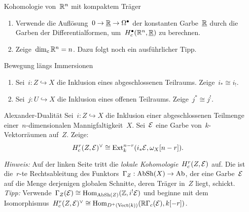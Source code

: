 \documentclass{uebblatt}
\begin{document}
\newpage

\begin{aufgabe}{Kohomologie von~$\mathbb{R}^n$ mit kompaktem Träger}
\begin{enumerate}
\item Verwende die Auflösung~$0 \to \underline{\mathbb{R}} \to \Omega^\bullet$ der konstanten
Garbe~$\underline{\mathbb{R}}$ durch die Garben der Differentialformen,
um~$H_c^\bullet(\mathbb{R}^n,\underline{\mathbb{R}})$ zu berechnen.
\item Zeige~$\dim_c \mathbb{R}^n = n$. {\tiny Dazu folgt noch ein ausführlicher Tipp.}
\end{enumerate}
\end{aufgabe}

\begin{aufgabe}{Bewegung längs Immersionen}
\begin{enumerate}
\item Sei~$i : Z \hookrightarrow X$ die Inklusion eines abgeschlossenen
Teilraums. Zeige~$i_* \cong i_!$.
\item Sei~$j : U \hookrightarrow X$ die Inklusion eines offenen Teilraums.
Zeige~$j^* \cong j^!$.
\end{enumerate}
\end{aufgabe}

\begin{aufgabe}{Alexander-Dualität}
Sei~$i : Z \hookrightarrow X$ die Inklusion einer abgeschlossenen Teilmenge
einer~$n$-dimensionalen Mannigfaltigkeit~$X$. Sei~$\mathcal{E}$ eine Garbe
von~$k$-Vektorräumen auf~$Z$. Zeige: \[ H_c^r(Z,\mathcal{E})^\vee \cong
\mathrm{Ext}_k^{n-r}(i_*\mathcal{E}, \omega_X[n-r]). \]

{\tiny\emph{Hinweis:} Auf der linken Seite tritt die \emph{lokale
Kohomologie}~$H_c^r(Z,\mathcal{E})$ auf. Die ist die~$r$-te Rechtsableitung des
Funktors~$\Gamma_Z : \mathrm{AbSh}(X) \to \mathrm{Ab}$, der eine Garbe~$\mathcal{E}$ auf die Menge
derjenigen globalen Schnitte, deren Träger in~$Z$ liegt, schickt. \emph{Tipp:}
Verwende~$\Gamma_Z(\mathcal{E}) \cong \mathrm{Hom}_{\mathrm{AbSh}(Z)}(\mathbb{Z},i^!\mathcal{E})$ und beginne mit dem
Isomorphismus~$H_c^r(Z,\mathcal{E})^\vee \cong \mathrm{Hom}_{D^+(\mathrm{Vect}(k))}(\mathbb{R} \Gamma_c(\mathcal{E}),
k[-r])$.\par}
\end{aufgabe}
\end{document}
